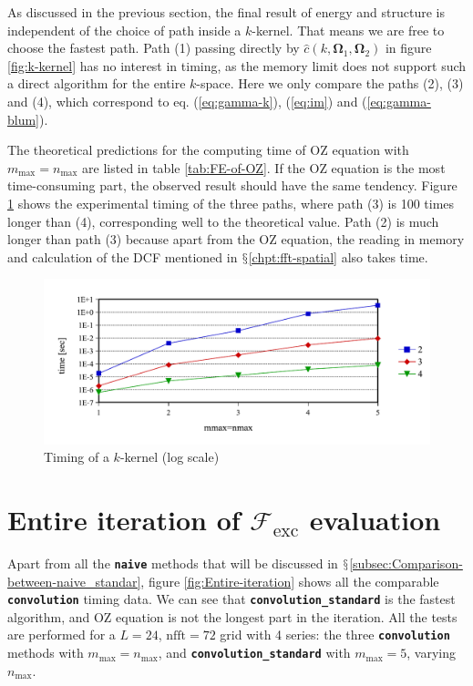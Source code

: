As discussed in the previous section, the final result of energy and
structure is independent of the choice of path inside a $k$-kernel.
That means we are free to choose the fastest path. Path (1) passing
directly by $\hat{c}(k,\mathbf{\Omega}_{1},\mathbf{\Omega}_{2})$
in figure \ref{fig:k-kernel} has no interest in timing, as the memory
limit does not support such a direct algorithm for the entire $k$-space.
Here we only compare the paths (2), (3) and (4), which correspond
to eq. (\ref{eq:gamma-k}), (\ref{eq:im}) and (\ref{eq:gamma-blum}).

The theoretical predictions for the computing time of \acs{OZ} equation
with $m_{\max}=n_{\max}$ are listed in table \ref{tab:FE-of-OZ}.
If the \acs{OZ} equation is the most time-consuming part, the observed
result should have the same tendency. Figure \ref{fig:Timing-k-kernel}
shows the experimental timing of the three paths, where path (3) is
100 times longer than (4), corresponding well to the theoretical value.
Path (2) is much longer than path (3) because apart from the \acs{OZ}
equation, the reading in memory and calculation of the \acs{DCF}
mentioned in $\mathsection$\ref{chpt:fft-spatial} also takes time.

\begin{figure}[H]
\begin{centering}
\includegraphics[bb=0bp 20bp 504bp 196bp,width=0.75\columnwidth]{_figure/results/k-kernel}
\par\end{centering}
\caption[Timing of a $k$-kernel]{Timing of a $k$-kernel (log scale)\label{fig:Timing-k-kernel}}
\end{figure}


\section{Entire iteration of $\mathcal{F}_{\mathrm{exc}}$ evaluation}

Apart from all the \texttt{\textbf{naive}} methods that will be discussed
in $\mathsection$\ref{subsec:Comparison-between-naive_standar},
figure \ref{fig:Entire-iteration} shows all the comparable \texttt{\textbf{convolution}}
timing data. We can see that \texttt{\textbf{convolution\_standard}}
is the fastest algorithm, and \acs{OZ} equation is not the longest
part in the iteration. All the tests are performed for a $L=24$,
$\mathrm{nfft}=72$ grid with 4 series: the three \texttt{\textbf{convolution}}
methods with $m_{\max}=n_{\max}$, and \texttt{\textbf{convolution\_standard}}
with $m_{\max}=5$, varying $n_{\max}$.

